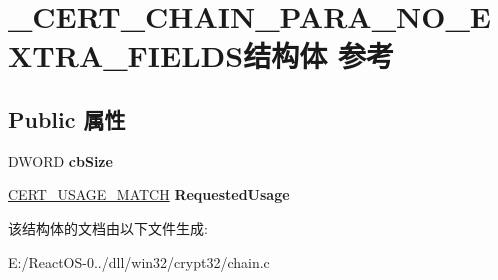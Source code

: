\hypertarget{struct___c_e_r_t___c_h_a_i_n___p_a_r_a___n_o___e_x_t_r_a___f_i_e_l_d_s}{}\section{\+\_\+\+C\+E\+R\+T\+\_\+\+C\+H\+A\+I\+N\+\_\+\+P\+A\+R\+A\+\_\+\+N\+O\+\_\+\+E\+X\+T\+R\+A\+\_\+\+F\+I\+E\+L\+D\+S结构体 参考}
\label{struct___c_e_r_t___c_h_a_i_n___p_a_r_a___n_o___e_x_t_r_a___f_i_e_l_d_s}
\subsection*{Public 属性}
\begin{DoxyCompactItemize}
\item 
\mbox{\label{struct___c_e_r_t___c_h_a_i_n___p_a_r_a___n_o___e_x_t_r_a___f_i_e_l_d_s_a894cf4ed16deae1ba22d3c0a39436c73}} 
D\+W\+O\+RD {\bfseries cb\+Size}
\item 
\mbox{\label{struct___c_e_r_t___c_h_a_i_n___p_a_r_a___n_o___e_x_t_r_a___f_i_e_l_d_s_a6ff876d511a584d9d4e02ed019e7eab1}} 
\hyperlink{struct___c_e_r_t___u_s_a_g_e___m_a_t_c_h}{C\+E\+R\+T\+\_\+\+U\+S\+A\+G\+E\+\_\+\+M\+A\+T\+CH} {\bfseries Requested\+Usage}
\end{DoxyCompactItemize}


该结构体的文档由以下文件生成\+:\begin{DoxyCompactItemize}
\item 
E\+:/\+React\+O\+S-\/0../dll/win32/crypt32/chain.\+c\end{DoxyCompactItemize}
